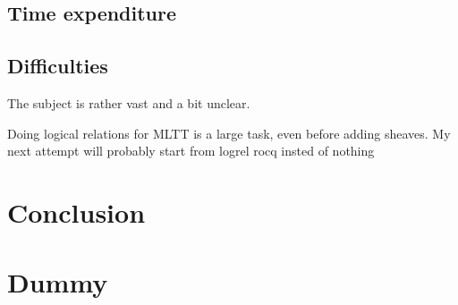 \documentclass[11pt]{article}
\newcommand{\0}{\mathbf{0}}
\newcommand{\1}{\mathbf{1}}
\begin{document}
\subsection{Time expenditure}


\subsection{Difficulties}

The subject is rather vast and a bit unclear.

Doing logical relations for MLTT is a large task, even before adding sheaves. My next attempt will probably start from logrel rocq insted of nothing


\section{Conclusion}



\newpage

\appendix
\appendixname

\section{Dummy}

\printbibliography
\end{document}
